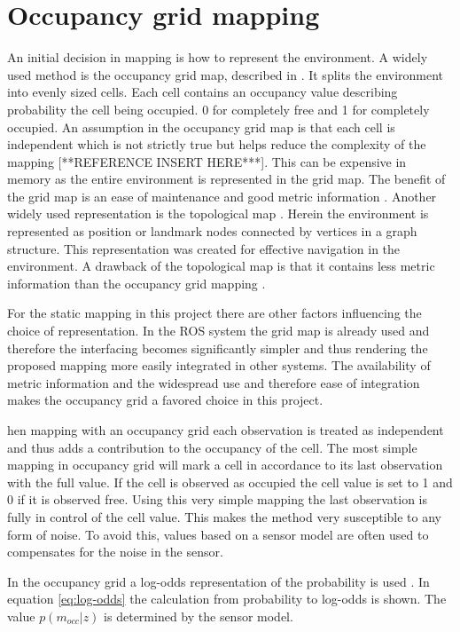 \section{Occupancy grid mapping}

An initial decision in mapping is how to represent the environment. A widely used method is the occupancy grid map, described in \cite{elfesMoravecOccGrid}. It splits the environment into evenly sized cells. Each cell contains an occupancy value describing probability the cell being occupied. 0 for completely free and 1 for completely occupied. An assumption in the occupancy grid map is that each cell is independent which is not strictly true but helps reduce the complexity of the mapping [**REFERENCE INSERT HERE***]. This can be expensive in memory as the entire environment is represented in the grid map. The benefit of the grid map is an ease of maintenance and good metric information \cite{mapbuildingSummary}. 
Another widely used representation is the topological map \cite{topologyOrig}. 
Herein the environment is represented as position or landmark nodes connected by vertices in a graph structure. 
This representation was created for effective navigation in the environment. 
A drawback of the topological map is that it contains less metric information than the occupancy grid mapping \cite{mapbuildingSummary}.

For the static mapping in this project there are other factors influencing the choice of representation. In the ROS system the grid map is already used and therefore the interfacing becomes significantly simpler and thus rendering the proposed mapping more easily integrated in other systems. The availability of metric information and the widespread use and therefore ease of integration makes the occupancy grid a favored choice in this project. 

hen mapping with an occupancy grid each observation is treated as independent and thus adds a contribution to the occupancy of the cell. The most simple mapping in occupancy grid will mark a cell in accordance to its last observation with the full value. If the cell is observed as occupied the cell value is set to 1 and 0 if it is observed free. Using this very simple mapping the last observation is fully in control of the cell value. This makes the method very susceptible to any form of noise. To avoid this, values based on a sensor model are often used to compensates for the noise in the sensor. 

In the occupancy grid a log-odds representation of the probability is used \cite{probRob}. In equation \ref{eq:log-odds} the calculation from probability to log-odds is shown. The value \(p(m_{occ}|z)\) is determined by the sensor model. 


